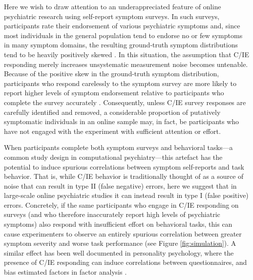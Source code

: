 \documentclass[a4paper,notitlepage,12pt]{article}
\begin{document}
Here we wish to draw attention to an underappreciated feature of online psychiatric research using self-report symptom surveys. In such surveys, participants rate their endorsement of various psychiatric symptoms and, since most individuals in the general population tend to endorse no or few symptoms in many symptom domains, the resulting ground-truth symptom distributions tend to be heavily positively skewed \cite{lowe2008validation, tomitaka2018distributional}. In this situation, the assumption that C/IE responding merely increases unsystematic measurement noise becomes untenable. Because of the positive skew in the ground-truth symptom distribution, participants who respond carelessly to the symptom survey are more likely to report higher levels of symptom endorsement relative to participants who complete the survey accurately \cite{chandler2020participant, ophir2020turker}. Consequently, unless C/IE survey responses are carefully identified and removed, a considerable proportion of putatively symptomatic individuals in an online sample may, in fact, be participants who have not engaged with the experiment with sufficient attention or effort.

When participants complete both symptom surveys and behavioral tasks---a common study design in computational psychiatry---this artefact has the potential to induce spurious correlations between symptom self-reports and task behavior. That is, while C/IE behavior is traditionally thought of as a source of noise that can result in type II (false negative) errors, here we suggest that in large-scale online psychiatric studies it can instead result in type I (false positive) errors. Concretely, if the same participants who engage in C/IE responding on surveys (and who therefore inaccurately report high levels of psychiatric symptoms) also respond with insufficient effort on behavioral tasks, this can cause experimenters to observe an entirely spurious correlation between greater symptom severity and worse task performance (see Figure \ref{fig:simulation}). A similar effect has been well documented in personality psychology, where the presence of C/IE responding can induce correlations between questionnaires, and bias estimated factors in factor analysis \cite{huang2012detecting, robinson2014inaccurate, huang2015insufficient, chandler2020participant, arias2020little}.
\end{document}
